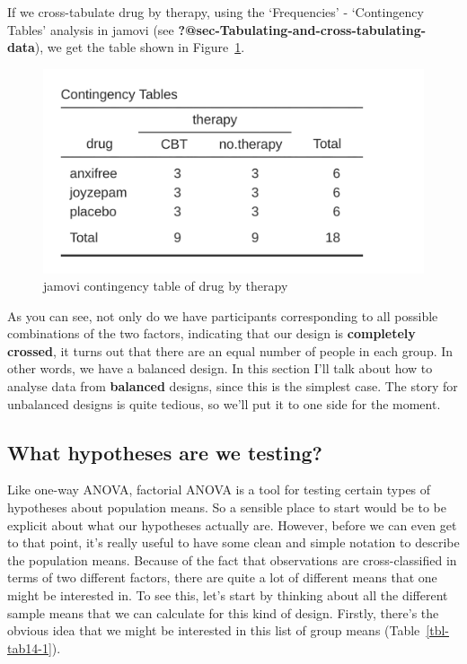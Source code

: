 \documentclass[
  a4paper,
]{book}
\begin{document}
If we cross-tabulate drug by therapy, using the `Frequencies' -
`Contingency Tables' analysis in jamovi (see
\textbf{?@sec-Tabulating-and-cross-tabulating-data}), we get the table
shown in Figure~\ref{fig-fig14-1}.

\begin{figure}

\includegraphics[width=1\textwidth,height=\textheight]{images/fig14-1.png} \hfill{}

\caption{\label{fig-fig14-1}jamovi contingency table of drug by therapy}

\end{figure}

As you can see, not only do we have participants corresponding to all
possible combinations of the two factors, indicating that our design is
\textbf{completely crossed}, it turns out that there are an equal number
of people in each group. In other words, we have a balanced design. In
this section I'll talk about how to analyse data from \textbf{balanced}
designs, since this is the simplest case. The story for unbalanced
designs is quite tedious, so we'll put it to one side for the moment.

\hypertarget{sec-What-hypotheses-are-we-testing}{%
\subsection{What hypotheses are we
testing?}\label{sec-What-hypotheses-are-we-testing}}

Like one-way ANOVA, factorial ANOVA is a tool for testing certain types
of hypotheses about population means. So a sensible place to start would
be to be explicit about what our hypotheses actually are. However,
before we can even get to that point, it's really useful to have some
clean and simple notation to describe the population means. Because of
the fact that observations are cross-classified in terms of two
different factors, there are quite a lot of different means that one
might be interested in. To see this, let's start by thinking about all
the different sample means that we can calculate for this kind of
design. Firstly, there's the obvious idea that we might be interested in
this list of group means (Table~\ref{tbl-tab14-1}).
\end{document}
